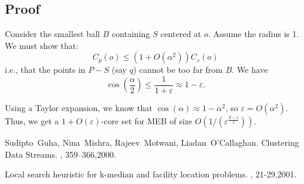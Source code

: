 \documentclass[11pt]{article}
\begin{document}
\subsection{Proof}
Consider the smallest ball $B$ containing $S$ centered at $o$. Assume the radius is 1. We must show that:
$$
C_p(o) \le (1+O(\alpha^2))C_s(o)
$$
i.e., that the points in $P-S$ (say $q$) cannot be too far from $B$. We have 
$$\cos\left(\frac{\alpha}{2}\right) \le \frac{1}{1+\varepsilon} \approx 1 - \varepsilon.$$

Using a Taylor expansion, we know that $\cos(\alpha) \approx 1-\alpha^2$, so $\varepsilon = O(\alpha^2)$. Thus, we get a $1 + O(\varepsilon)$-core set for MEB of size $O(1/(\varepsilon^{\frac{d-1}{2}}))$.


\begin{thebibliography}{42}

Sudipto~Guha, Nina~Mishra, Rajeev~Motwani, Liadan~O'Callaghan.
\newblock Clustering Data Streams. 
, 359--366,2000.

\newblock Local search heuristic for k-median and facility location problems.
, 21-29,2001.

\end{thebibliography}
\end{document}
